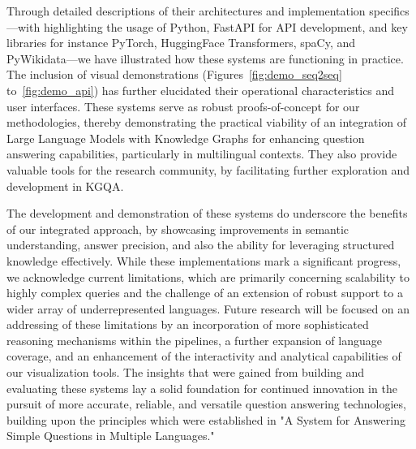 Through detailed descriptions of their architectures and implementation specifics—with highlighting the usage of Python, FastAPI for API development, and key libraries for instance PyTorch, HuggingFace Transformers, spaCy, and PyWikidata—we have illustrated how these systems are functioning in practice. The inclusion of visual demonstrations (Figures~\ref{fig:demo_seq2seq} to~\ref{fig:demo_api}) has further elucidated their operational characteristics and user interfaces. These systems serve as robust proofs-of-concept for our methodologies, thereby demonstrating the practical viability of an integration of Large Language Models with Knowledge Graphs for enhancing question answering capabilities, particularly in multilingual contexts. They also provide valuable tools for the research community, by facilitating further exploration and development in KGQA.

The development and demonstration of these systems do underscore the benefits of our integrated approach, by showcasing improvements in semantic understanding, answer precision, and also the ability for leveraging structured knowledge effectively. While these implementations mark a significant progress, we acknowledge current limitations, which are primarily concerning scalability to highly complex queries and the challenge of an extension of robust support to a wider array of underrepresented languages. Future research will be focused on an addressing of these limitations by an incorporation of more sophisticated reasoning mechanisms within the pipelines, a further expansion of language coverage, and an enhancement of the interactivity and analytical capabilities of our visualization tools. The insights that were gained from building and evaluating these systems lay a solid foundation for continued innovation in the pursuit of more accurate, reliable, and versatile question answering technologies, building upon the principles which were established in "A System for Answering Simple Questions in Multiple Languages."


